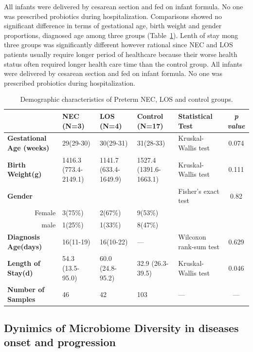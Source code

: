 \documentclass[fleqn,10pt,lineno]{wlpeerj} %
\begin{document}
  \noindent
   All infants were delivered by cesarean section and fed on infant formula. No one was prescribed probiotics during hospitalization. Comparisons showed no significant difference in terms of gestational age, birth weight and gender proportions, diagnosed age among three groups (Table~\ref{tab:demographic}). Lenth of stay mong three groups was significantly different however rational since NEC and LOS patients usually require longer period of healthcare because their worse health status often required longer health care time than the control group.
   All infants were delivered by cesarean section and fed on infant formula. No one was prescribed probiotics during hospitalization.
    \begin{table}[!hpb]
       \centering
       \caption{\label{tab:demographic}Demographic characteristics of Preterm NEC, LOS and control groups.}
      \begin{tabular}{lp{1.8cm}p{1.8cm}p{1.8cm}p{2cm}c}
        \toprule
         & \textbf{NEC (N=3)} & \textbf{LOS (N=4)} & \textbf{Control (N=17)} & \textbf{Statistical Test} & \textit{p value} \\ \midrule
        \textbf{Gestational Age (weeks)} & 29(29-30) & 30(29-31) & 31(28-33) & Kruskal-Wallis test & 0.074 \\
        \textbf{Birth Weight(g)} & 1416.3 (773.4-2149.1) & 1141.7 (633.4-1649.9) & 1527.4 (1391.6-1663.1) & Kruskal-Wallis test & 0.111 \\
        \textbf{Gender} &  &  &  & Fisher's exact test & 0.82 \\
        \multicolumn{1}{r}{Female} & 3(75\%) & 2(67\%) & 9(53\%) &  & \\
        \multicolumn{1}{r}{male} & 1(25\%) & 1(33\%) & 8(47\%) &  & \\
        \textbf{Diagnosis Age(days)} & 16(11-19) & 16(10-22) & — & Wilcoxon rank-sum test & 0.629 \\
        \textbf{Length of Stay(d)} & 54.3 (13.5-95.0) & 60.0 (24.8-95.2) & 32.9 (26.3-39.5) & Kruskal-Wallis test & 0.046 \\
        \textbf{Number of Samples} & 46 & 42 & 103 & — & — \\ \bottomrule
      \end{tabular}
    \end{table}

   \subsection*{Dynimics of Microbiome Diversity in diseases onset and progression}
\end{document}
